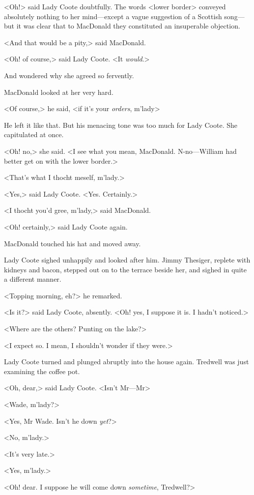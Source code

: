 <Oh!> said Lady Coote doubtfully. The words <lower border> conveyed absolutely nothing to her mind—except a vague suggestion of a Scottish song—but it was clear that to MacDonald they constituted an insuperable objection.

<And that would be a pity,> said MacDonald.

<Oh! of course,> said Lady Coote. <It \emph{would}.>

And wondered why she agreed so fervently.

MacDonald looked at her very hard.

<Of course,> he said, <if it's your \emph{orders}, m'lady\longdash>

He left it like that. But his menacing tone was too much for Lady Coote. She capitulated at once.

<Oh! no,> she said. <I see what you mean, MacDonald. N-no—William had better get on with the lower border.>

<That's what I thocht meself, m'lady.>

<Yes,> said Lady Coote. <Yes. Certainly.>

<I thocht you'd gree, m'lady,> said MacDonald.

<Oh! certainly,> said Lady Coote again.

MacDonald touched his hat and moved away.

Lady Coote sighed unhappily and looked after him. Jimmy Thesiger, replete with kidneys and bacon, stepped out on to the terrace beside her, and sighed in quite a different manner.

<Topping morning, eh?> he remarked.

<Is it?> said Lady Coote, absently. <Oh! yes, I suppose it is. I hadn't noticed.>

<Where are the others? Punting on the lake?>

<I expect so. I mean, I shouldn't wonder if they were.>

Lady Coote turned and plunged abruptly into the house again. Tredwell was just examining the coffee pot.

<Oh, dear,> said Lady Coote. <Isn't Mr—Mr\longdash>

<Wade, m'lady?>

<Yes, Mr Wade. Isn't he down \emph{yet}?>

<No, m'lady.>

<It's very late.>

<Yes, m'lady.>

<Oh! dear. I suppose he will come down \emph{sometime}, Tredwell?>

